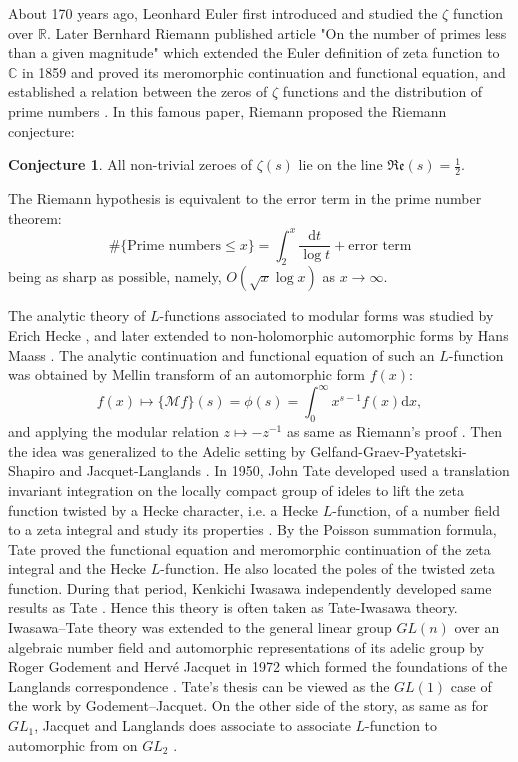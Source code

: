 \documentclass[12pt,a4paper,english]{article}
\theoremstyle{plain}
\theoremstyle{definition}
\newtheorem{conj}{Conjecture}
\begin{document}
About 170 years ago, Leonhard Euler first introduced and studied the $\zeta$ function over $\mathbb{R}$. Later Bernhard Riemann published article "On the number of primes less than a given magnitude" which extended the Euler definition of zeta function to $\mathbb{C}$ in 1859 and proved its meromorphic continuation and functional equation, and established a relation between the zeros of $\zeta$ functions and the distribution of prime numbers \cite{riemann1859ueber}. In this famous paper, Riemann proposed the Riemann conjecture:
\begin{conj}
All non-trivial zeroes of $\zeta(s)$ lie on the line $\mathfrak{Re}(s)=\frac{1}{2}$. 

The Riemann hypothesis is equivalent to the error term in the prime number theorem:
\begin{equation*}
    \#\{\text{Prime numbers}\leq x\}=\int^{x}_{2}\frac{\text{d}t}{\log t}+\text{error term}
\end{equation*}
being as sharp as possible, namely, $O(\sqrt{x}\log x)$ as $x\rightarrow\infty$.
\end{conj}

The analytic theory of $L$-functions associated to modular forms was studied by Erich Hecke \cite{hecke1936bestimmung}, and later extended to non-holomorphic automorphic forms by Hans Maass \cite{maass1949neue}. The analytic continuation and functional equation of such an $L$-function was obtained by Mellin transform of an automorphic form $f(x)$:
\begin{equation*}
    f(x)\mapsto \{\mathcal{M}f\}(s)=\phi(s)=\int^{\infty}_{0}x^{s-1}f(x)\text{d}x, 
\end{equation*}
and applying the modular relation $z\mapsto -z^{-1}$ as same as Riemann's proof \cite{riemann1859ueber}. Then the idea was generalized to the Adelic setting by Gelfand-Graev-Pyatetski-Shapiro \cite{gelfand1968representation} and Jacquet-Langlands \cite{langlands1970automorphic}. In 1950, John Tate
developed used a translation invariant integration on the locally compact group of ideles to lift the zeta function twisted by a Hecke character, i.e. a Hecke $L$-function, of a number field to a zeta integral and study its properties \cite{tate1997fourier}.  By the Poisson summation formula, Tate proved the functional equation and meromorphic continuation of the zeta integral and the Hecke $L$-function. He also located the poles of the twisted zeta function. During that period, Kenkichi Iwasawa independently developed same results as Tate \cite{iwasawa1992letter}. Hence this theory is often taken as Tate-Iwasawa theory. Iwasawa–Tate theory was extended to the general linear group $GL(n)$ over an algebraic number field and automorphic representations of its adelic group by Roger Godement and Hervé Jacquet in 1972 which formed the foundations of the Langlands correspondence \cite{godement1974notes}. Tate's thesis can be viewed as the $GL(1)$ case of the work by Godement–Jacquet.
On the other side of the story, as same as for $GL_{1}$, Jacquet and Langlands does associate to associate $L$-function to automorphic from on $GL_{2}$ \cite{langlands1970automorphic}.
\end{document}
